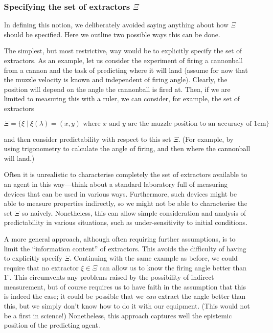\documentclass[information,article,submit,moreauthors,pdftex,12pt,a4paper]{mdpi}
\theoremstyle{mdpi}
\newcounter{ex}
\newcounter{re}
\theoremstyle{mdpidefinition}
\begin{document}
\subsubsection{Specifying the set of extractors $\Xi$}

In defining this notion, we deliberately avoided saying anything about how $\Xi$ should be specified.
Here we  outline two possible ways this can be done.

The simplest, but most restrictive, way would be to explicitly specify the set of extractors.
As an example, let us consider the experiment of firing a cannonball from a cannon and the task of predicting where it will land (assume for now that the muzzle velocity is known and independent of firing angle).
Clearly, the position will depend on the angle the cannonball is fired at.
Then, if we are limited to measuring this with a ruler, we can consider, for example, the set of extractors

$$\Xi=\{\xi \mid \text{$\xi(\lambda)=(x,y)$ where $x$ and $y$ are the muzzle position to an accuracy of 1cm}\}$$

\noindent
and then consider predictability with respect to this set $\Xi$.
(For example, by using trigonometry to calculate the angle of firing, and then where the cannonball will land.)

Often it is unrealistic to characterise completely the set of extractors available to an agent in this way---think about a standard laboratory full of measuring devices that can be used in various ways.
Furthermore, such devices might be able to measure properties indirectly, so we might not be able to characterise the set $\Xi$ so naively.
Nonetheless, this can allow simple consideration and analysis of predictability in various situations, such as under-sensitivity to initial conditions.

A more general approach, although often requiring further assumptions, is to limit the ``information content'' of extractors.
This avoids the difficulty of having to explicitly specify $\Xi$.
Continuing with the same example as before, we could require that no extractor $\xi\in\Xi$ can allow us to know the firing angle better than $1^\circ$.
This circumvents any problems raised by the possibility of indirect measurement, but of course requires us to have faith in the assumption that this is indeed the case;
it could be possible that we \emph{can} extract the angle better than this, but we simply don't know how to do it with our equipment.
(This would not be a first in science!)
Nonetheless, this approach captures well the epistemic position of the predicting agent.
\end{document}
